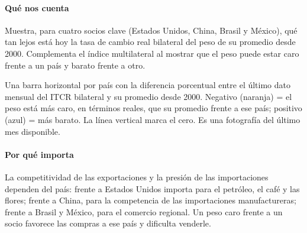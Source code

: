 \paragraph{Qué nos cuenta}
Muestra, para cuatro socios clave (Estados Unidos, China, Brasil y México), qué tan lejos está hoy la tasa de cambio real bilateral del peso de su promedio desde 2000. Complementa el índice multilateral al mostrar que el peso puede estar caro frente a un país y barato frente a otro.

\begin{leer}
Una barra horizontal por país con la diferencia porcentual entre el último dato mensual del ITCR bilateral y su promedio desde 2000. Negativo (naranja) = el peso está más caro, en términos reales, que su promedio frente a ese país; positivo (azul) = más barato. La línea vertical marca el cero. Es una fotografía del último mes disponible.
\end{leer}

\paragraph{Por qué importa}
La competitividad de las exportaciones y la presión de las importaciones dependen del país: frente a Estados Unidos importa para el petróleo, el café y las flores; frente a China, para la competencia de las importaciones manufactureras; frente a Brasil y México, para el comercio regional. Un peso caro frente a un socio favorece las compras a ese país y dificulta venderle.

